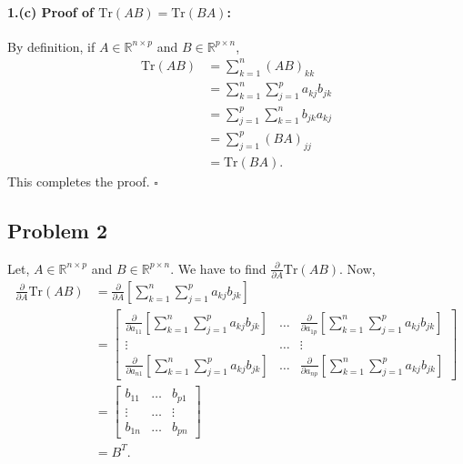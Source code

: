 \paragraph{1.(c) Proof of $\text{Tr}(AB) = \text{Tr}(BA)$:}By definition, if $A \in \mathbb{R}^{n\times p}$ and $B \in \mathbb{R}^{p \times n}$,
\begin{align*}
	\text{Tr}(AB) &= \sum_{k=1}^{n} (AB)_{kk}\\
	&= \sum_{k=1}^{n} \sum_{j=1}^{p}a_{kj}b_{jk}\\
	&= \sum_{j=1}^{p} \sum_{k=1}^{n}b_{jk}a_{kj}\\
	&= \sum_{j=1}^{p}(BA)_{jj}\\
	&= \text{Tr}(BA).
\end{align*}
This completes the proof. $\square$
\subsection*{Problem 2}
Let, $A \in \mathbb{R}^{n \times p}$ and $B \in \mathbb{R}^{p \times n}$. We have to find $\frac{\partial}{\partial A}\text{Tr}(AB)$. Now,
\begin{align*}
	\frac{\partial}{\partial A} \text{Tr}(AB) &= \frac{\partial}{\partial A} \left[\sum_{k=1}^{n}\sum_{j=1}^{p}a_{kj}b_{jk}\right]\\
	&= \begin{bmatrix}\frac{\partial}{\partial a_{11}} \left[\sum_{k=1}^{n}\sum_{j=1}^{p}a_{kj}b_{jk}\right] & \ldots & \frac{\partial}{\partial a_{1p}} \left[\sum_{k=1}^{n}\sum_{j=1}^{p}a_{kj}b_{jk}\right]\\
	\vdots & \ldots & \vdots\\
	\frac{\partial}{\partial a_{n1}} \left[\sum_{k=1}^{n}\sum_{j=1}^{p}a_{kj}b_{jk}\right] & \ldots & \frac{\partial}{\partial a_{np}} \left[\sum_{k=1}^{n}\sum_{j=1}^{p}a_{kj}b_{jk}\right]\end{bmatrix}\\
	&= \begin{bmatrix}b_{11} & \ldots & b_{p1}\\
	\vdots & \ldots & \vdots\\
	b_{1n} & \ldots & b_{pn}\end{bmatrix}\\
	&= B^T.
\end{align*}

